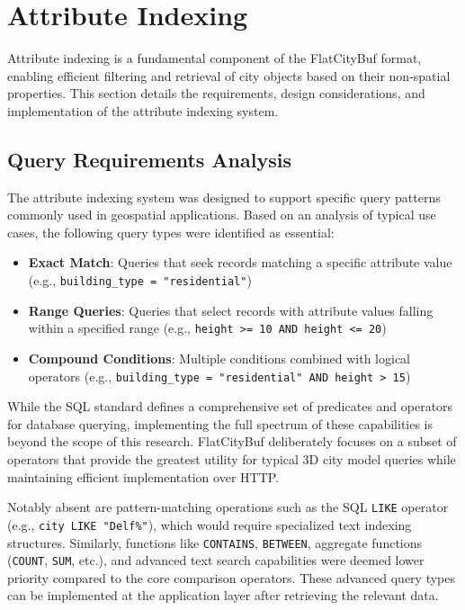 
\section{Attribute Indexing}
\label{methodology:attribute_index}

Attribute indexing is a fundamental component of the FlatCityBuf format, enabling efficient filtering and retrieval of city objects based on their non-spatial properties. This section details the requirements, design considerations, and implementation of the attribute indexing system.

\subsection{Query Requirements Analysis}
\label{methodology:attribute_index:query_requirements}

The attribute indexing system was designed to support specific query patterns commonly used in geospatial applications. Based on an analysis of typical use cases, the following query types were identified as essential:

\begin{itemize}
    \item \textbf{Exact Match}: Queries that seek records matching a specific attribute value (e.g., \texttt{building\_type = "residential"})
    \item \textbf{Range Queries}: Queries that select records with attribute values falling within a specified range (e.g., \texttt{height >= 10 AND height <= 20})
    \item \textbf{Compound Conditions}: Multiple conditions combined with logical operators (e.g., \texttt{building\_type = "residential" AND height > 15})
\end{itemize}

While the SQL standard \citep{iso_9075_2_2023} defines a comprehensive set of predicates and operators for database querying, implementing the full spectrum of these capabilities is beyond the scope of this research. FlatCityBuf deliberately focuses on a subset of operators that provide the greatest utility for typical 3D city model queries while maintaining efficient implementation over HTTP.

Notably absent are pattern-matching operations such as the SQL \texttt{LIKE} operator (e.g., \texttt{city LIKE "Delf\%"}), which would require specialized text indexing structures. Similarly, functions like \texttt{CONTAINS}, \texttt{BETWEEN}, aggregate functions (\texttt{COUNT}, \texttt{SUM}, etc.), and advanced text search capabilities were deemed lower priority compared to the core comparison operators. These advanced query types can be implemented at the application layer after retrieving the relevant data.

